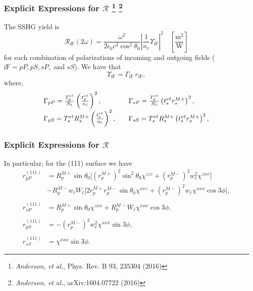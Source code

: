 \documentclass{beamer}
\begin{document}
\begin{frame}
\frametitle{Explicit Expressions for $\mathcal{R}$%
\footnote{\emph{Anderson, et al.}, Phys. Rev. B 93, 235304 (2016)}
\footnote{\emph{Anderson, et al.}, arXiv:1604.07722 (2016)}
}
The SSHG yield is
\begin{equation*}
\mathcal{R}_{\mathrm{iF}}(2\omega) =
\frac{\omega^{2}}{2\epsilon_{0}c^3\cos^{2}\theta_{0}}
\left\vert\frac{1}{n_{\ell}}\Upsilon_{\mathrm{iF}}\right\vert^{2}
\quad\left[\frac{\mathrm{m}^{2}}{\mathrm{W}}\right]
\end{equation*}
for each combination of polarizations of incoming and outgoing fields
($\mathrm{iF} = pP, pS, sP,$ and $sS$). We have that
\begin{equation*}\label{eq:mc25}
\Upsilon_{\mathrm{iF}} = \Gamma_{\mathrm{iF}}\,r_{\mathrm{iF}},
\end{equation*}
where,
$$
\begin{array}{ l l }
\Gamma_{pP} =
\frac{T^{v\ell}_{p}}{N_{\ell}}
\left(\frac{t^{v\ell}_{p}}{n_{\ell}}\right)^{2},
&
\Gamma_{sP}=
\frac{T^{v\ell}_{p}}{N_{\ell}}
\left(t^{v\ell}_{s}r^{M+}_{s}\right)^{2},\quad\\
\Gamma_{pS} =
T_{s}^{v\ell}R^{M+}_{s}
\left(\frac{t^{v\ell}_{p}}{n_{\ell}}\right)^{2},\quad
&
\Gamma_{sS} = 
T_{s}^{v\ell}R^{M+}_{s}\left(t^{v\ell}_{s}r^{M+}_{s}\right)^{2},
\end{array}
$$
\end{frame}

\begin{frame}
\frametitle{Explicit Expressions for $\mathcal{R}$}
In particular, for the (111) surface we have
\begin{align*}
r^{(111)}_{pP} &= 
R^{M+}_{p}\sin\theta_{0}
\Big[
  \left(r^{M+}_{p}\right)^{2}\sin^{2}\theta_{0}\chi^{zzz}
+ \left(r^{M-}_{p}\right)^{2}w^{2}_{\ell}\chi^{zxx}
\Big]\\
&- R^{M-}_{p}w_{\ell}W_{\ell}
\Big[
  2r^{M+}_{p}r^{M-}_{p}\sin\theta_{0}\chi^{xxz}
+ \left(r^{M-}_{p}\right)^{2}w_{\ell}\chi^{xxx}\cos3\phi
\Big],\\\\
r^{(111)}_{sP} &= 
R^{M+}_{p}\sin\theta_{0}\chi^{zxx} +
R^{M-}_{p}W_{\ell}\chi^{xxx}\cos3\phi,\\\\
r^{(111)}_{pS} &= - \left(r^{M-}_{p}\right)^{2}w^{2}_{\ell}\chi^{xxx}\sin3\phi,\\\\
r^{(111)}_{sS} &= \chi^{xxx}\sin3\phi.
\end{align*}
\end{frame}
\end{document}

